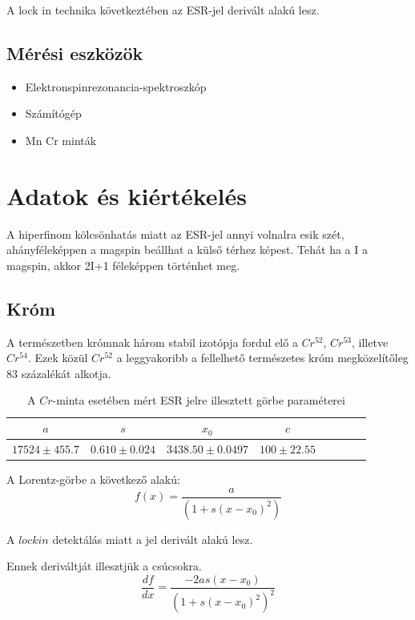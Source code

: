\documentclass[a4paper,12pt]{article}
\begin{document}
A lock in technika következtében az ESR-jel derivált alakú lesz.

\subsection{Mérési eszközök}

\begin{itemize}
\item Elektronspinrezonancia-spektroszkóp
\item Számítógép
\item Mn Cr minták
\end{itemize}

\section{Adatok és kiértékelés}

A hiperfinom kölcsönhatás miatt az ESR-jel annyi volnalra esik szét, ahányféleképpen a magspin beállhat a külső térhez képest. Tehát ha a I a magspin, akkor 2I+1 féleképpen történhet meg.

\subsection{Króm}

A természetben krómnak három stabil izotópja fordul elő a $Cr^{52}$, $Cr^{53}$, illetve $Cr^{54}$. Ezek közül $Cr^{52}$ a leggyakoribb a fellelhető természetes króm megközelítőleg 83 százalékát alkotja. 

\begin{table}[h!]
\begin{center}
\begin{tabular}{|c|c|c|c|c|c|c|c|}
 \hline
$a$ & $s$ & $x_0$ & $c$ \\ \hline
$17524 \pm 455.7$ & $0.610 \pm 0.024$ & $3438.50 \pm 0.0497$ & $100 \pm 22.55$  \\ \hline
\end{tabular}
\caption{A $Cr$-minta esetében mért ESR jelre illesztett görbe paraméterei}
\label{tab:3}
\end{center}
\end{table}

A Lorentz-görbe a következő alakú:
\[  f(x) = \frac{a}{(1+s(x-x_0)^2)}\]

A $lock in$ detektálás miatt a jel derivált alakú lesz. 

Ennek deriváltját illesztjük a csúcsokra.
\[ \frac{df}{dx} = \frac{-2as(x-x_0)}{(1+s(x-x_0)^2)^2}\]
\end{document}
